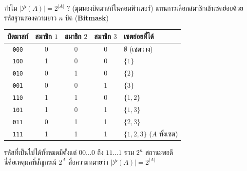 \begin{frame}{ทำไม $|\mathcal{P}(A)| = 2^{|A|}$ ? (มุมมองบิตมาสก์ในคอมพิวเตอร์)}
  แทนการเลือกสมาชิกเข้าเซตย่อยด้วยรหัสฐานสองความยาว $n$ บิต (\textbf{Bitmask})
  \begin{center}\small
  \begin{tabular}{|c|c|c|c|l|}
    \hline
    \textbf{บิตมาสก์} & สมาชิก $1$ & สมาชิก $2$ & สมาชิก $3$ & \textbf{เซตย่อยที่ได้} \\ \hline
    \texttt{000} & 0 & 0 & 0 & $\emptyset$ (เซตว่าง) \\ \hline
    \texttt{100} & 1 & 0 & 0 & $\{1\}$ \\ \hline
    \texttt{010} & 0 & 1 & 0 & $\{2\}$ \\ \hline
    \texttt{001} & 0 & 0 & 1 & $\{3\}$ \\ \hline
    \texttt{110} & 1 & 1 & 0 & $\{1, 2\}$ \\ \hline
    \texttt{101} & 1 & 0 & 1 & $\{1, 3\}$ \\ \hline
    \texttt{011} & 0 & 1 & 1 & $\{2, 3\}$ \\ \hline
    \texttt{111} & 1 & 1 & 1 & $\{1, 2, 3\}$ ($A$ ทั้งเซต) \\ \hline
  \end{tabular}
  \end{center}
  \vspace{0.2em}
  \footnotesize รหัสที่เป็นไปได้ทั้งหมดมีตั้งแต่ $00\ldots0$ ถึง $11\ldots1$ รวม $2^n$ สถานะพอดี \\
  นี่คือเหตุผลที่สัญกรณ์ $2^A$ สื่อความหมายว่า $|\mathcal{P}(A)| = 2^{|A|}$
\end{frame}

